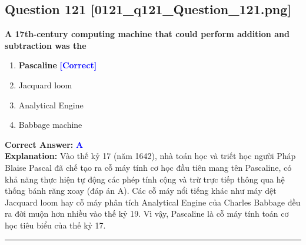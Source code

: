 \documentclass[11pt,a4paper]{article}
\begin{document}
\begin{minipage}{\textwidth}
\subsection*{Question 121 \quad \footnotesize{[0121\_q121\_Question\_121.png]}}
\noindent \textbf{A 17th-century computing machine that could perform addition and subtraction was the}

\begin{enumerate}[label=\Alph*.]
    \item \textbf{Pascaline} \hfill \textcolor{blue}{\textbf{[Correct]}}
    \item Jacquard loom
    \item Analytical Engine
    \item Babbage machine
\end{enumerate}

\noindent \textbf{Correct Answer:} \textcolor{blue}{\textbf{A}} \\[2pt]
\noindent \textbf{Explanation:} Vào thế kỷ 17 (năm 1642), nhà toán học và triết học người Pháp Blaise Pascal đã chế tạo ra cỗ máy tính cơ học đầu tiên mang tên Pascaline, có khả năng thực hiện tự động các phép tính cộng và trừ trực tiếp thông qua hệ thống bánh răng xoay (đáp án A). Các cỗ máy nổi tiếng khác như máy dệt Jacquard loom hay cỗ máy phân tích Analytical Engine của Charles Babbage đều ra đời muộn hơn nhiều vào thế kỷ 19. Vì vậy, Pascaline là cỗ máy tính toán cơ học tiêu biểu của thế kỷ 17.

\par\vspace{0.3cm}
\hrule
\vspace{0.3cm}
\end{minipage}
\end{document}
